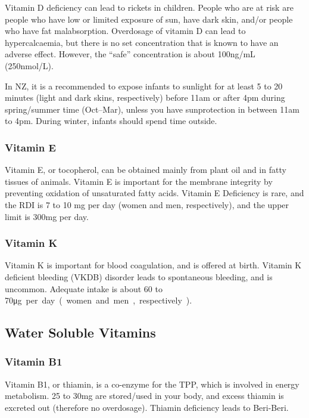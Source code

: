 Vitamin D deficiency can lead to rickets in children.
People who are at risk are people who have low or limited exposure of sun, have dark skin, and/or people who have fat malabsorption.
Overdosage of vitamin D can lead to hypercalcaemia, but there is no set concentration that is known to have an adverse effect.
However, the ``safe'' concentration is about 100ng/mL (250nmol/L).

In NZ, it is a recommended to expose infants to sunlight for at least 5 to 20 minutes (light and dark skins, respectively) before 11am or after 4pm during spring/summer time (Oct--Mar), unless you have sunprotection in between 11am to 4pm.
During winter, infants should spend time outside.

\subsubsection{Vitamin E}

Vitamin E, or tocopherol, can be obtained mainly from plant oil and in fatty tissues of animals.
Vitamin E is important for the membrane integrity by preventing oxidation of unsaturated fatty acids.
Vitamin E Deficiency is rare, and the RDI is 7 to 10 mg per day (women and men, respectively), and the upper limit is 300mg per day.

\subsubsection{Vitamin K}

Vitamin K is important for blood coagulation, and is offered at birth.
Vitamin K deficient bleeding (VKDB) disorder leads to spontaneous bleeding, and is uncommon.
Adequate intake is about 60 to 70\si\micro g per day (women and men, respectively).

\subsection{Water Soluble Vitamins}

\subsubsection{Vitamin B1}

Vitamin B1, or thiamin, is a co-enzyme for the TPP, which is involved in energy metabolism.
25 to 30mg are stored/used in your body, and excess thiamin is excreted out (therefore no overdosage).
Thiamin deficiency leads to Beri-Beri.

